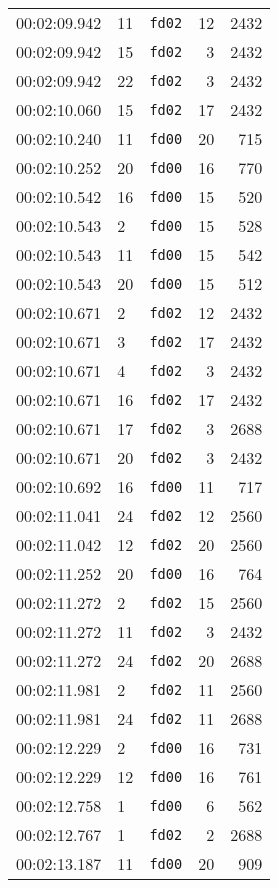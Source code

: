 \documentclass{article}
\begin{document}
\begin{longtable}{lllrr}
00:02:09.942 & 11 & \texttt{fd02} & 12 & 2432 \\
00:02:09.942 & 15 & \texttt{fd02} & 3 & 2432 \\
00:02:09.942 & 22 & \texttt{fd02} & 3 & 2432 \\
00:02:10.060 & 15 & \texttt{fd02} & 17 & 2432 \\
00:02:10.240 & 11 & \texttt{fd00} & 20 & 715 \\
00:02:10.252 & 20 & \texttt{fd00} & 16 & 770 \\
00:02:10.542 & 16 & \texttt{fd00} & 15 & 520 \\
00:02:10.543 & 2 & \texttt{fd00} & 15 & 528 \\
00:02:10.543 & 11 & \texttt{fd00} & 15 & 542 \\
00:02:10.543 & 20 & \texttt{fd00} & 15 & 512 \\
00:02:10.671 & 2 & \texttt{fd02} & 12 & 2432 \\
00:02:10.671 & 3 & \texttt{fd02} & 17 & 2432 \\
00:02:10.671 & 4 & \texttt{fd02} & 3 & 2432 \\
00:02:10.671 & 16 & \texttt{fd02} & 17 & 2432 \\
00:02:10.671 & 17 & \texttt{fd02} & 3 & 2688 \\
00:02:10.671 & 20 & \texttt{fd02} & 3 & 2432 \\
00:02:10.692 & 16 & \texttt{fd00} & 11 & 717 \\
00:02:11.041 & 24 & \texttt{fd02} & 12 & 2560 \\
00:02:11.042 & 12 & \texttt{fd02} & 20 & 2560 \\
00:02:11.252 & 20 & \texttt{fd00} & 16 & 764 \\
00:02:11.272 & 2 & \texttt{fd02} & 15 & 2560 \\
00:02:11.272 & 11 & \texttt{fd02} & 3 & 2432 \\
00:02:11.272 & 24 & \texttt{fd02} & 20 & 2688 \\
00:02:11.981 & 2 & \texttt{fd02} & 11 & 2560 \\
00:02:11.981 & 24 & \texttt{fd02} & 11 & 2688 \\
00:02:12.229 & 2 & \texttt{fd00} & 16 & 731 \\
00:02:12.229 & 12 & \texttt{fd00} & 16 & 761 \\
00:02:12.758 & 1 & \texttt{fd00} & 6 & 562 \\
00:02:12.767 & 1 & \texttt{fd02} & 2 & 2688 \\
00:02:13.187 & 11 & \texttt{fd00} & 20 & 909 \\

\end{longtable}
\end{document}
